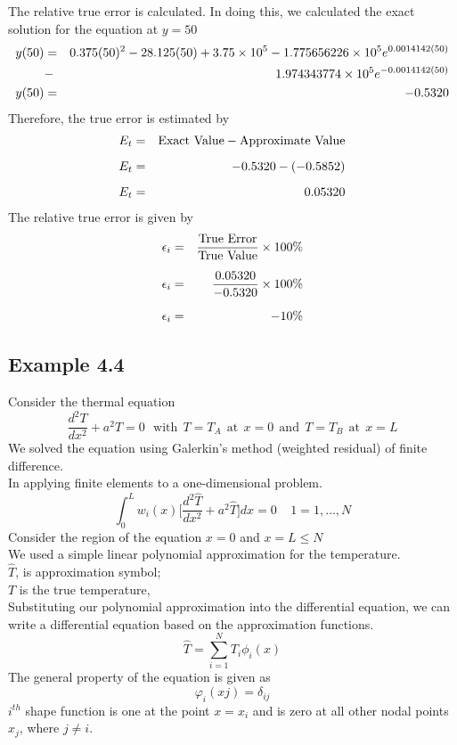 \documentclass[12pt]{report}
\newcommand{\sps}{\\[0.2cm]}
\newcommand{\NI}{\noindent}
\begin{document}
	\NI The relative true error is calculated. In doing this, we calculated the exact solution for the
	equation at $y = 50$
	\begin{eqnarray}
		y(50) &=& 0.375(50)^2 - 28.125(50) + 3.75 \times 10^5 - 1.775656226 \times 10^5 e^{0.0014142(50)} \notag\\
		&-&1.974343774 \times 10^5 e^{-0.0014142(50)}\notag \\
		y(50) &=& -0.5320\notag
	\end{eqnarray}
	Therefore, the true error is estimated by
	\begin{eqnarray}
		E_t &=& \text{Exact Value} - \text{Approximate Value}\notag\sps
		E_t &=& -0.5320 - (-0.5852)\notag\sps
		E_t &=& 0.05320\notag
	\end{eqnarray}
	The relative true error is given by
	\begin{eqnarray}
		\epsilon_i &=& \frac{\text{True Error}}{\text{True Value}} \times 100\%\notag\sps
		\epsilon_i &=& \frac{0.05320}{-0.5320} \times 100\%\notag\sps
		\epsilon_i &=& -10\%\notag
	\end{eqnarray}
	
	
	\subsection*{Example 4.4}
	Consider the thermal equation
	\begin{equation}
		\frac{d^2T}{dx^2}+a^2T=0 ~~~\text{with}~~ T=T_A ~~\text{at}~~ x=0 ~~\text{and}~~ T=T_B ~~\text{at}~~ x = L\label{eq:4_21}
	\end{equation}
	We solved the equation using Galerkin’s method (weighted residual) of finite difference.\\
	
	\NI In applying finite elements to a one-dimensional problem.
	\begin{equation}
		\int_0^L w_i(x)\Biggl[\frac{d^2\hat{T}}{dx^2}+a^2\hat{T}\Biggr]dx = 0 ~~~~~ 1=1,\ldots,N \label{eq:4_22}
	\end{equation}
	Consider the region of the equation $x=0$ and $x=L \leq N$\sps
	We used a simple linear polynomial approximation for the temperature.\sps
	$\hat{T}$, is approximation symbol;\sps
	$T$ is the true temperature,\sps
	
	\NI Substituting our polynomial approximation into the differential equation, we can write a differential equation based on the approximation functions.
	\begin{equation}
		\hat{T} = \sum_{i=1}^{N}T_i\phi_i(x) \label{eq:4_23}
	\end{equation}
	The general property of the equation is given as
	\begin{equation}
		\varphi_i(xj) = \delta_{ij}\label{eq:4_24}
	\end{equation}
	$i^{th}$ shape function is one at the point $x=x_i$ and is zero at all other nodal points $x_j$, where $j \neq i$.\sps
	
\end{document}
